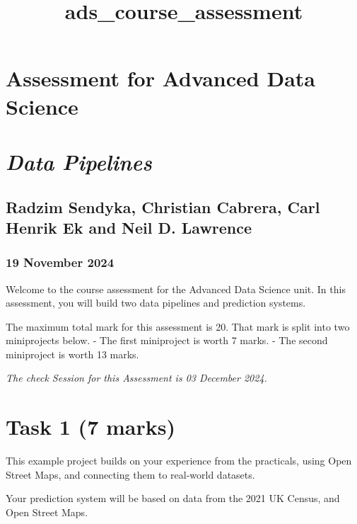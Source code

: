 \documentclass[11pt]{article}
\title{ads\_course\_assessment}
\begin{document}
    
    \maketitle
    
    

    
    

    \section{Assessment for Advanced Data
Science}\label{assessment-for-advanced-data-science}

\section{\texorpdfstring{\emph{Data
Pipelines}}{Data Pipelines}}\label{data-pipelines}

    \subsection{Radzim Sendyka, Christian Cabrera, Carl Henrik Ek and Neil
D.
Lawrence}\label{radzim-sendyka-christian-cabrera-carl-henrik-ek-and-neil-d.-lawrence}

\subsubsection{19 November 2024}\label{november-2024}

    Welcome to the course assessment for the Advanced Data Science unit. In
this assessment, you will build two data pipelines and prediction
systems.

The maximum total mark for this assessment is 20. That mark is split
into two miniprojects below. - The first miniproject is worth 7 marks. -
The second miniproject is worth 13 marks.

\emph{The check Session for this Assessment is 03 December 2024.}

    \section{Task 1 (7 marks)}\label{task-1-7-marks}

    This example project builds on your experience from the practicals,
using Open Street Maps, and connecting them to real-world datasets.

Your prediction system will be based on data from the 2021 UK Census,
and Open Street Maps.
\end{document}
